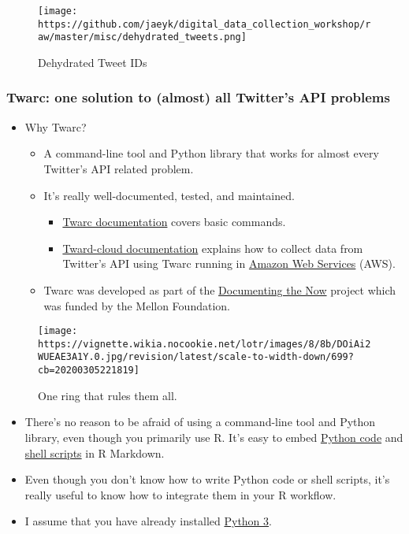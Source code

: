 \documentclass[
]{book}
\providecommand{\tightlist}{%
  \setlength{\itemsep}{0pt}\setlength{\parskip}{0pt}}
\begin{document}
\begin{figure}
\centering
\texttt{[image: https://github.com/jaeyk/digital\_data\_collection\_workshop/raw/master/misc/dehydrated\_tweets.png]}
\caption{Dehydrated Tweet IDs}
\end{figure}

\hypertarget{twarc-one-solution-to-almost-all-twitters-api-problems}{%
\subsubsection{Twarc: one solution to (almost) all Twitter's API problems}\label{twarc-one-solution-to-almost-all-twitters-api-problems}}

\begin{itemize}
\item
  Why Twarc?

  \begin{itemize}
  \item
    A command-line tool and Python library that works for almost every Twitter's API related problem.
  \item
    It's really well-documented, tested, and maintained.

    \begin{itemize}
    \tightlist
    \item
      \href{https://scholarslab.github.io/learn-twarc/06-twarc-command-basics}{Twarc documentation} covers basic commands.
    \item
      \href{https://twarc-cloud.readthedocs.io/_/downloads/en/stable/pdf/}{Tward-cloud documentation} explains how to collect data from Twitter's API using Twarc running in \href{https://aws.amazon.com/}{Amazon Web Services} (AWS).
    \end{itemize}
  \item
    Twarc was developed as part of the \href{https://www.docnow.io/}{Documenting the Now} project which was funded by the Mellon Foundation.
  \end{itemize}
\end{itemize}

\begin{figure}
\centering
\texttt{[image: https://vignette.wikia.nocookie.net/lotr/images/8/8b/DOiAi2WUEAE3A1Y.0.jpg/revision/latest/scale-to-width-down/699?cb=20200305221819]}
\caption{One ring that rules them all.}
\end{figure}

\begin{itemize}
\item
  There's no reason to be afraid of using a command-line tool and Python library, even though you primarily use R. It's easy to embed \href{https://bookdown.org/yihui/rmarkdown/language-engines.html\#python}{Python code} and \href{https://bookdown.org/yihui/rmarkdown/language-engines.html\#shell-scripts}{shell scripts} in R Markdown.
\item
  Even though you don't know how to write Python code or shell scripts, it's really useful to know how to integrate them in your R workflow.
\item
  I assume that you have already installed \href{https://www.python.org/download/releases/3.0/}{Python 3}.
\end{itemize}
\end{document}
